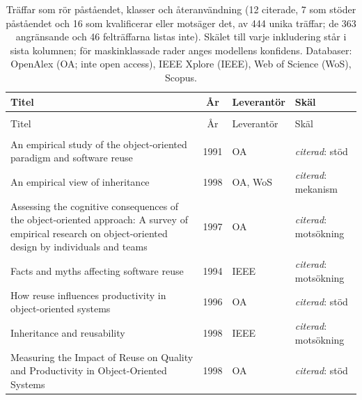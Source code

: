 
\begingroup\footnotesize
\begin{longtable}{@{}%
  >{\raggedright\arraybackslash}p{}c%
  >{\raggedright\arraybackslash}p{}%
  >{\raggedright\arraybackslash}p{}@{}}
\caption{Träffar som rör påståendet, klasser och återanvändning (12 citerade, 7 som stöder påståendet och 16 som kvalificerar eller motsäger det, av 444 unika träffar; de 363 angränsande och 46 felträffarna listas inte). Skälet till varje inkludering står i sista kolumnen; för maskinklassade rader anges modellens konfidens. Databaser: OpenAlex (OA; inte open access), IEEE Xplore (IEEE), Web of Science (WoS), Scopus.}\label{tab:sok-ateranvandning}\\
\toprule
Titel & År & Leverantör & Skäl \\
\midrule
\endfirsthead
\multicolumn{4}{@{}l}{\emph{\tablename~\thetable{} (forts.)}}\\
\toprule
Titel & År & Leverantör & Skäl \\
\midrule
\endhead
\midrule \multicolumn{4}{r@{}}{\emph{forts.\ på nästa sida}}\\
\endfoot
\bottomrule
\endlastfoot
An empirical study of the object-oriented paradigm and software reuse & 1991 & OA & \emph{citerad}: stöd \\
An empirical view of inheritance & 1998 & OA, WoS & \emph{citerad}: mekanism \\
Assessing the cognitive consequences of the object-oriented approach: A survey of empirical research on object-oriented design by individuals and teams & 1997 & OA & \emph{citerad}: motsökning \\
Facts and myths affecting software reuse & 1994 & IEEE & \emph{citerad}: motsökning \\
How reuse influences productivity in object-oriented systems & 1996 & OA & \emph{citerad}: stöd \\
Inheritance and reusability & 1998 & IEEE & \emph{citerad}: motsökning \\
Measuring the Impact of Reuse on Quality and Productivity in Object-Oriented Systems & 1998 & OA & \emph{citerad}: stöd \\

\end{longtable}
